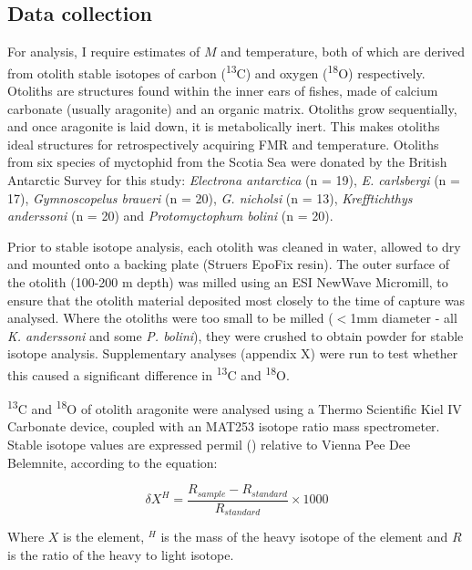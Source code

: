 \documentclass[12pt, titlepage]{article}
\begin{document}
\subsection{Data collection}

For analysis, I require estimates of $M$ and temperature, both of which are derived from otolith stable isotopes of carbon (\textdelta \textsuperscript{13}C) and oxygen (\textdelta \textsuperscript{18}O) respectively.
Otoliths are structures found within the inner ears of fishes,  made of calcium carbonate (usually aragonite) and an organic matrix. 
Otoliths grow sequentially, and once aragonite is laid down, it is metabolically inert.
This makes otoliths ideal structures for retrospectively acquiring FMR and temperature. %
Otoliths from six species of myctophid from the Scotia Sea were donated by the British Antarctic Survey for this study: \textit{Electrona antarctica} (n = 19), \textit{E. carlsbergi} (n = 17), \textit{Gymnoscopelus braueri} (n = 20), \textit{G. nicholsi} (n = 13), \textit{Krefftichthys anderssoni} (n = 20) and \textit{Protomyctophum bolini} (n = 20).

Prior to stable isotope analysis, each otolith was cleaned in water, allowed to dry and mounted onto a backing plate (Struers EpoFix resin).
The outer surface of the otolith (100-200 \textmu m depth) was milled using an ESI NewWave Micromill, to ensure that the otolith material deposited most closely to the time of capture was analysed.
Where the otoliths were too small to be milled ($<$1mm diameter - all \textit{K. anderssoni} and some \textit{P. bolini}), they were crushed to obtain powder for stable isotope analysis.
Supplementary analyses (appendix X) were run to test whether this caused a significant difference in \textdelta \textsuperscript{13}C and \textdelta \textsuperscript{18}O.

\textdelta \textsuperscript{13}C and \textdelta \textsuperscript{18}O of otolith aragonite were analysed using a Thermo Scientific Kiel IV Carbonate device, coupled with an MAT253 isotope ratio mass spectrometer.
Stable isotope values are expressed permil (\permil) %
relative to Vienna Pee Dee Belemnite, according to the equation:

\begin{equation}
\delta X^{H} = \frac{R_{sample} - R_{standard}}{R_{standard}} \times 1000
\end{equation}

Where $X$ is the element, $^{H}$ is the mass of the heavy isotope of the element and $R$ is the ratio of the heavy to light isotope. %
\end{document}
